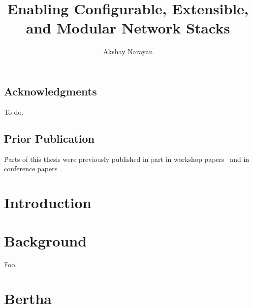 \documentclass[fontsize=12pt,paper=letter,twosided,cleardoublepage=plain,final]{scrbook}
\title{Enabling Configurable, Extensible, and Modular Network Stacks}
\author{Akshay Narayan}
\begin{document}
\frontmatter



\cleardoublepage


\cleardoublepage

\section*{Acknowledgments}
\begin{spacing}{1}
%
    To do.
\end{spacing}
\cleardoublepage

\section*{Prior Publication}
Parts of this thesis were previously published in part in workshop papers~\cite{ccp, bertha} and in conference
papers~\cite{ccp, bundler, park}.
\cleardoublepage

\tableofcontents

\mainmatter

\chapter{Introduction}\label{s:intro}



\chapter{Background}\label{s:background}

Foo.

\chapter{Bertha}\label{s:bertha}







\end{document}
